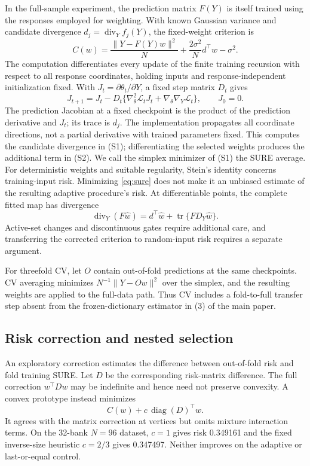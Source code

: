\documentclass[pdflatex,sn-mathphys-ay]{sn-jnl}
\theoremstyle{remark}\newtheorem{remark}[theorem]{Remark}
\newcommand{\tr}{\operatorname{tr}}
\begin{document}
In the full-sample experiment, the prediction matrix $F(Y)$ is itself trained using the responses employed for weighting. With known Gaussian variance and candidate divergence $d_j=\operatorname{div}_Y f_j(Y)$, the fixed-weight criterion is
\begin{equation}
 C(w)=\frac{\|Y-F(Y)w\|^2}{N}
       +\frac{2\sigma^2}{N}d^\top w-\sigma^2.\label{eq:sure}
\end{equation}
The computation differentiates every update of the finite training recursion with respect to all response coordinates, holding inputs and response-independent initialization fixed. With $J_t=\partial\theta_t/\partial Y$, a fixed step matrix $D_t$ gives
\[
 J_{t+1}=J_t-D_t\{\nabla_\theta^2\mathcal L_t J_t+
 \nabla_\theta\nabla_Y\mathcal L_t\},\qquad J_0=0.
\]
The prediction Jacobian at a fixed checkpoint is the product of the prediction derivative and $J_t$; its trace is $d_j$. The implementation propagates all coordinate directions, not a partial derivative with trained parameters fixed. This computes the candidate divergence in (S1); differentiating the selected weights produces the additional term in (S2). We call the simplex minimizer of (S1) the SURE average. For deterministic weights and suitable regularity, Stein's identity concerns training-input risk. Minimizing \eqref{eq:sure} does not make it an unbiased estimate of the resulting adaptive procedure's risk. At differentiable points, the complete fitted map has divergence
\begin{equation}
 \operatorname{div}_Y(F\hat w)=d^\top\hat w+
 \tr\{F D_Y\hat w\}.\label{eq:extra}
\end{equation}
Active-set changes and discontinuous gates require additional care, and transferring the corrected criterion to random-input risk requires a separate argument.

For threefold CV, let $O$ contain out-of-fold predictions at the same checkpoints. CV averaging minimizes $N^{-1}\|Y-Ow\|^2$ over the simplex, and the resulting weights are applied to the full-data path. Thus CV includes a fold-to-full transfer step absent from the frozen-dictionary estimator in (3) of the main paper.

\subsection{Risk correction and nested selection}
An exploratory correction estimates the difference between out-of-fold risk and fold training SURE. Let $D$ be the corresponding risk-matrix difference. The full correction $w^\top Dw$ may be indefinite and hence need not preserve convexity. A convex prototype instead minimizes
\begin{equation}
 C(w)+c\,\operatorname{diag}(D)^\top w.\label{eq:correction}
\end{equation}
It agrees with the matrix correction at vertices but omits mixture interaction terms. On the 32-bank $N=96$ dataset, $c=1$ gives risk 0.349161 and the fixed inverse-size heuristic $c=2/3$ gives 0.347497. Neither improves on the adaptive or last-or-equal control.
\end{document}
